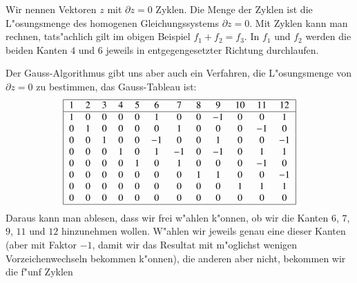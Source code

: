 Wir nennen Vektoren $z$ mit $\partial z=0$ Zyklen.
Die Menge der Zyklen ist die L"osungsmenge des homogenen
Gleichungssystems $\partial z=0$. Mit Zyklen kann man rechnen,
tats"achlich gilt im obigen Beispiel $f_1+f_2=f_3$. In $f_1$
und $f_2$ werden die beiden Kanten $4$ und $6$ jeweils in
entgegengesetzter Richtung durchlaufen.

Der Gauss-Algorithmus gibt uns aber auch ein Verfahren, die
L"osungsmenge von $\partial z=0$ zu bestimmen, das Gauss-Tableau
ist:
\[
\begin{tabular}{|cccccccccccc|}
\hline
   1&  2&  3&  4&  5&  6&  7&  8&  9& 10& 11& 12\\
\hline
   1&  0&  0&  0&  0&  1&  0&  0&$-1$&  0&  0&  1\\
   0&  1&  0&  0&  0&  0&  1&  0&  0&  0&$-1$&  0\\
   0&  0&  1&  0&  0&$-1$&  0&  0&  1&  0&  0&$-1$\\
   0&  0&  0&  1&  0&  1&$-1$&  0&$-1$&  0&  1&  1\\
   0&  0&  0&  0&  1&  0&  1&  0&  0&  0&$-1$&  0\\
   0&  0&  0&  0&  0&  0&  0&  1&  1&  0&  0&$-1$\\
   0&  0&  0&  0&  0&  0&  0&  0&  0&  1&  1&  1\\
   0&  0&  0&  0&  0&  0&  0&  0&  0&  0&  0&  0\\
\hline
\end{tabular}
\]
Daraus kann man ablesen, dass wir frei w"ahlen
k"onnen, ob wir die Kanten $6$, $7$, $9$, $11$ und $12$
hinzunehmen wollen. W"ahlen wir jeweils genau
eine dieser Kanten (aber mit Faktor $-1$, damit wir das Resultat
mit m"oglichst wenigen Vorzeichenwechseln bekommen k"onnen),
die anderen aber nicht, bekommen wir die f"unf Zyklen
